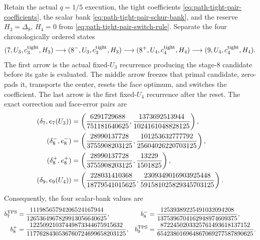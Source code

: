 \begin{proposition}
\label{prop:path-tight-pair-local-chain-stop}
Retain the actual $q=1/5$ execution, the tight coefficients
\cref{eq:path-tight-pair-coefficients}, the scalar bank
\cref{eq:path-tight-pair-schur-bank}, and the reserve
$H_3=\Delta_8$, $H_4=0$ from
\cref{eq:path-tight-pair-switch-rule}.  Separate the four chronologically
ordered states
\begin{equation}
 (7,U_3,c_3^{\rm tight},H_3)
 \longrightarrow(8^-,U_3,c_3^{\rm tight},H_3)
 \longrightarrow(8^+,U_4,c_4^{\rm tight},H_4)
 \longrightarrow(9,U_4,c_4^{\rm tight},H_4).
 \label{eq:path-tight-pair-local-chain-chronology}
\end{equation}
The first arrow is the actual fixed-$U_3$ recurrence producing the stage-$8$
candidate before its gate is evaluated.  The middle arrow freezes that primal
candidate, zero-pads it, transports the center, resets the face optimum, and
switches the coefficient.  The last arrow is the first fixed-$U_4$ recurrence
after the reset.  The exact correction and face-error pairs are
\begin{align}
 (\delta_7,e_7(U_3))
 &=\left(
   \frac{6291729688}{751181640625},
   \frac{1373692513944}{1024161048828125}
   \right),
 \notag\\
 (\delta_8^-,e_8^-)
 &=\left(
   \frac{28990137728}{3755908203125},
   \frac{101253632777792}{25604026220703125}
   \right),
 \notag\\
 (\delta_8^+,e_8^+)
 &=\left(
   \frac{28990137728}{3755908203125},
   \frac{13229}{1501825}
   \right),
 \notag\\
 (\delta_9,e_9(U_4))
 &=\left(
   \frac{228031410368}{18779541015625},
   \frac{2309349016903925448}{591581025829345703125}
   \right).
 \label{eq:path-tight-pair-local-chain-components}
\end{align}
Consequently, the four scalar-bank values are
\begin{align}
 b_7^{\rm TPS}
 &=\frac{11198565794206524167944}
         {1265364967829913056640625},
 &
 b_8^-
 &=\frac{12539389225491032094208}
         {1375396704162948974609375},
 \notag\\
 b_8^+
 &=\frac{12250921037449873344675915632}
         {1177628430536760724699658203125},
 &
 b_9^{\rm TPS}
 &=\frac{8722450203325761493618137152}
         {654238016964867069277587890625}.
 \label{eq:path-tight-pair-local-chain-bank-values}
\end{align}


\end{proposition}
